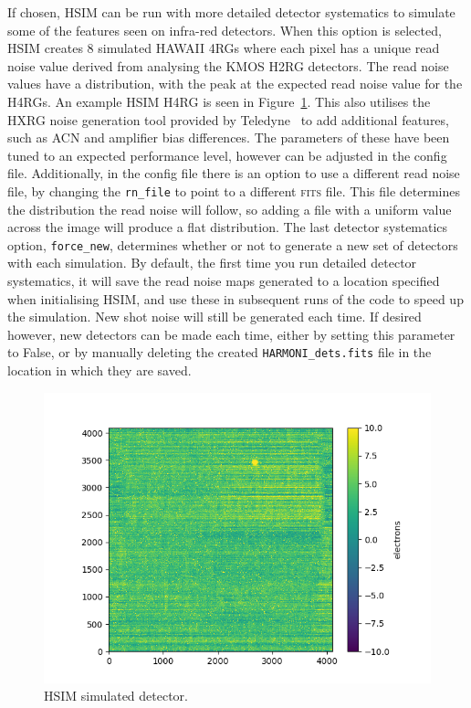 \documentclass[12pt]{report}
\begin{document}
If chosen, HSIM can be run with more detailed detector systematics to simulate some of the features seen on infra-red detectors. When this option is selected, HSIM creates 8 simulated HAWAII 4RGs where each pixel has a unique read noise value derived from analysing the KMOS H2RG detectors. The read noise values have a distribution, with the peak at the expected read noise value for the H4RGs. An example HSIM H4RG is seen in Figure~\ref{fig:hsimdet}. This also utilises the HXRG noise generation tool provided by Teledyne~\citep{Rauscher2015} to add additional features, such as ACN and amplifier bias differences. The parameters of these have been tuned to an expected performance level, however can be adjusted in the config file.  Additionally, in the config file there is an option to use a different read noise file, by changing the \texttt{rn\_file} to point to a different \textsc{fits} file. This file determines the distribution the read noise will follow, so adding a file with a uniform value across the image will produce a flat distribution. The last detector systematics option, \texttt{force\_new}, determines whether or not to generate a new set of detectors with each simulation. By default, the first time you run detailed detector systematics, it will save the read noise maps generated to a location specified when initialising HSIM, and use these in subsequent runs of the code to speed up the simulation. New shot noise will still be generated each time. If desired however, new detectors can be made each time, either by setting this parameter to False, or by manually deleting the created \texttt{HARMONI\_dets.fits} file in the location in which they are saved.

\begin{figure}[!h]
\centering
\includegraphics[width=\textwidth]{hsim-sim-det.png}
\caption{\small HSIM simulated detector.}\label{fig:hsimdet}
\end{figure}
\end{document}
